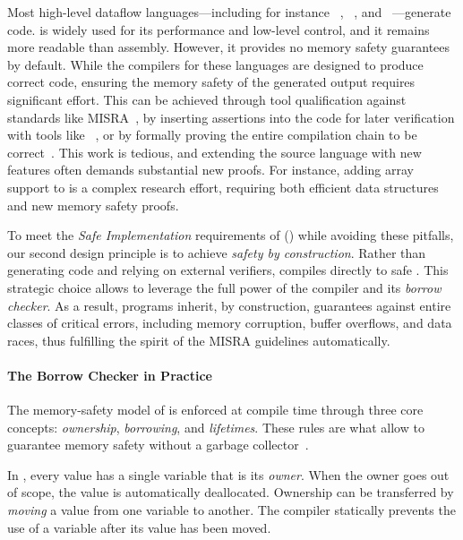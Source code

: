 Most high-level dataflow languages---including for instance \Simulink~\cite{simulink_codegen},
\Velus~\cite{DBLP:conf/pldi/BourkeBDLPR17}, and \LustreC~\cite{lustrec}---generate \Ci code. \Ci is widely used for its
performance and low-level control, and it remains more readable than assembly. However, it provides
no memory safety guarantees by default. While the compilers for these languages are designed to
produce correct code, ensuring the memory safety of the generated \Ci output requires significant
effort. This can be achieved through tool qualification against standards like
MISRA~\cite{simulink_misra}, by inserting assertions into the code for later verification with tools
like \FramaC~\cite{framac,lustrec}, or by formally proving the entire compilation chain to be
correct~\cite{velus}. This work is tedious, and extending the source language with new features
often demands substantial new proofs. For instance, adding array support to \Velus is a complex
research effort, requiring both efficient data structures and new memory safety proofs.

To meet the \emph{Safe Implementation} requirements of \iso
() while avoiding these pitfalls, our second design
principle is to achieve \emph{safety by construction}. Rather than generating \Ci code and relying
on external verifiers, \GRust compiles directly to safe \Rust. This strategic choice allows \GRust
to leverage the full power of the \Rust compiler and its \emph{borrow checker}. As a result, \GRust
programs inherit, by construction, guarantees against entire classes of critical errors, including
memory corruption, buffer overflows, and data races, thus fulfilling the spirit of the MISRA
guidelines automatically.

\paragraph{The Borrow Checker in Practice}
The memory-safety model of \Rust is enforced at compile time through three core concepts:
\emph{ownership}, \emph{borrowing}, and \emph{lifetimes}. These rules are what allow \Rust to
guarantee memory safety without a garbage collector~\cite{DBLP:journals/cacm/JungJKD21}.

In \Rust, every value has a single variable that is its \emph{owner}. When the owner goes out of
scope, the value is automatically deallocated. Ownership can be transferred by \emph{moving} a value
from one variable to another. The compiler statically prevents the use of a variable after its value
has been moved.

